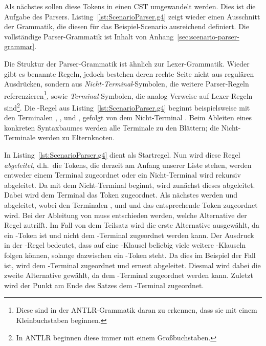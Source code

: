 Als nächstes sollen diese Tokens in einen CST umgewandelt werden.
Dies ist die Aufgabe des Parsers.
Listing~\ref{lst:ScenarioParser.g4} zeigt wieder einen Ausschnitt der Grammatik,
die diesen für das Beispiel-Scenario ausreichend definiert.
Die vollständige Parser-Grammatik ist Inhalt von Anhang~\ref{sec:scenario-parser-grammar}.


Die Struktur der Parser-Grammatik ist ähnlich zur Lexer-Grammatik.
Wieder gibt es benannte Regeln, jedoch bestehen deren rechte Seite nicht aus regulären Ausdrücken,
sondern aus \emph{Nicht-Terminal}-Symbolen, die weitere Parser-Regeln referenzieren\footnote{Diese sind in der ANTLR-Grammatik daran zu erkennen, dass sie mit einem Kleinbuchstaben beginnen.},
sowie \emph{Terminal}-Symbolen, die analog Verweise auf Lexer-Regeln sind\footnote{In ANTLR beginnen diese immer mit einem Großbuchstaben.}.
Die -Regel aus Listing~\ref{lst:ScenarioParser.g4} beginnt beispielsweise mit den Terminalen , ,  und , gefolgt von dem Nicht-Terminal .
Beim Ableiten eines konkreten Syntaxbaumes werden alle Terminale zu den Blättern;
die Nicht-Terminale werden zu Elternknoten.

In Listing~\ref{lst:ScenarioParser.g4} dient  als Startregel.
Nun wird diese Regel \emph{abgeleitet}, d.h.\ die Tokens, die derzeit am Anfang unserer Liste stehen, werden entweder einem Terminal zugeordnet oder ein Nicht-Terminal wird rekursiv abgeleitet.
Da  mit dem Nicht-Terminal  beginnt, wird zunächst dieses abgeleitet.
Dabei wird dem Terminal  das Token  zugeordnet.
Als nächstes werden  und  abgeleitet, wobei den Terminalen ,  und  und  das entsprechende Token zugeordnet wird.
Bei der Ableitung von  muss entschieden werden, welche Alternative der Regel zutrifft.
Im Fall von dem Teilsatz  wird die erste Alternative ausgewählt, da  ein -Token ist und nicht dem -Terminal zugeordnet werden kann.
Der Ausdruck  in der -Regel bedeutet, dass auf eine -Klausel beliebig viele weitere -Klauseln folgen können, solange dazwischen ein -Token steht.
Da dies im Beispiel der Fall ist, wird  dem -Terminal zugeordnet und  erneut abgeleitet.
Diesmal wird dabei die zweite Alternative gewählt, da  dem -Terminal zugeordnet werden kann.
Zuletzt wird der Punkt am Ende des Satzes dem -Terminal zugeordnet.

